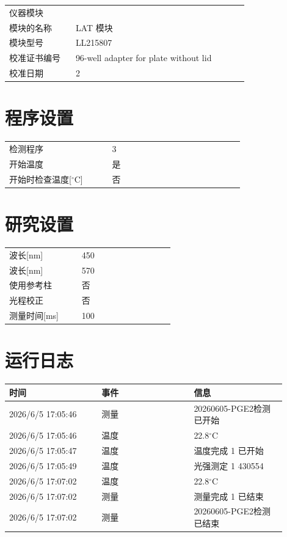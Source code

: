 \documentclass[UTF8,10pt,a4paper,fontset=fandol]{ctexart}
\begin{document}
\medskip
\begin{tabular}{@{}p{0.25\linewidth}p{0.65\linewidth}@{}}
仪器模块 & \\
模块的名称 & LAT 模块 \\
模块型号 & LL215807 \\
校准证书编号 & 96-well adapter for plate without lid \\
校准日期 & 2 \\
\end{tabular}

\section*{程序设置}

\begin{tabular}{@{}p{0.35\linewidth}p{0.45\linewidth}@{}}
检测程序 & 3 \\
开始温度 & 是 \\
开始时检查温度[$^\circ$C] & 否 \\
\end{tabular}

\section*{研究设置}

\begin{tabular}{@{}p{0.35\linewidth}p{0.45\linewidth}@{}}
波长[nm] & 450 \\
波长[nm] & 570 \\
使用参考柱 & 否 \\
光程校正 & 否 \\
测量时间[ms] & 100 \\
\end{tabular}

\section*{运行日志}

\begin{tabular}{@{}p{0.30\linewidth}p{0.30\linewidth}p{0.30\linewidth}@{}}
时间 & 事件 & 信息 \\ \hline
2026/6/5 17:05:46 & 测量 & 20260605-PGE2检测 已开始 \\
2026/6/5 17:05:46 & 温度 & 22.8$^\circ$C \\
2026/6/5 17:05:47 & 温度 & 温度完成 1 已开始 \\
2026/6/5 17:05:49 & 温度 & 光强测定 1 430554 \\
2026/6/5 17:07:02 & 温度 & 22.8$^\circ$C \\
2026/6/5 17:07:02 & 测量 & 测量完成 1 已结束 \\
2026/6/5 17:07:02 & 测量 & 20260605-PGE2检测 已结束 \\
\end{tabular}
\end{document}

